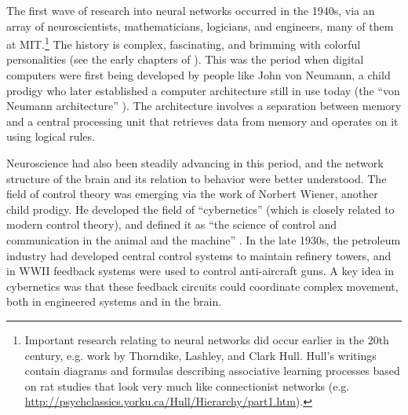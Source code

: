 The first wave of research into neural networks occurred in the 1940s, via an array of neuroscientists, mathematicians, logicians, and engineers, many of them at MIT.\footnote{Important research relating to neural networks did occur earlier in the 20th century, e.g. work by Thorndike, Lashley, and Clark Hull. Hull's writings contain diagrams and formulas describing associative learning processes based on rat studies that look very much like connectionist networks (e.g. \url{http://psychclassics.yorku.ca/Hull/Hierarchy/part1.htm}).}   The history is complex, fascinating, and brimming with colorful personalities (see the early chapters of \cite{anderson2000talking}). This was the period when digital computers were first being developed by people like John von Neumann, a child prodigy who  later established a computer architecture still in use today (the ``von Neumann architecture''  \cite{von1981principles}). The architecture involves a separation between memory and a central processing unit that retrieves data from memory and operates on it using logical rules.

Neuroscience had also been steadily advancing in this period, and the network structure of the brain and its relation to behavior were better understood. The field of control theory was emerging via the work of Norbert Wiener, another child prodigy. He developed the field of ``cybernetics'' (which is closely related to modern control theory), and defined it as ``the science of control and communication in the animal and the machine'' \cite[p. 16]{wiener1948cybernetics}. In the late 1930s, the petroleum industry had developed central control systems to maintain refinery towers, and in WWII feedback systems were used to control anti-aircraft guns. A key idea in cybernetics was that these feedback circuits could coordinate complex movement, both in engineered systems and in the brain.


